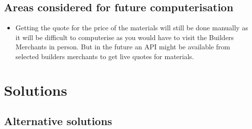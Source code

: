\subsection{Areas considered for future computerisation}
	\begin{itemize}

		\item Getting the quote for the price of the materials will still be done manually as it will be difficult to computerise as you would have to visit the Builders Merchants in person. But in the future an API might be available from selected builders merchants to get live quotes for materials.
	\end{itemize}

\pagebreak
\section{Solutions}

\subsection{Alternative solutions}

